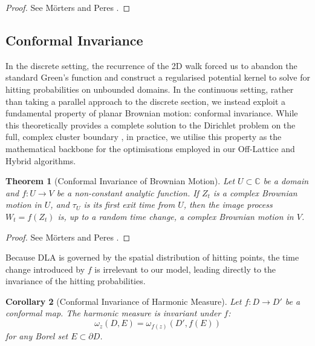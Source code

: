 \documentclass[12pt, a4paper, oneside]{report}
\newtheorem{theorem}{Theorem}[chapter]
\newtheorem{corollary}[theorem]{Corollary}
\theoremstyle{remark}
\begin{document}
\begin{proof}
See M{\"o}rters and Peres \cite[Theorem 3.18]{Morters2010}.
\end{proof}

\subsection{Conformal Invariance}
\label{sec:conformal_invariance}

In the discrete setting, the recurrence of the 2D walk forced us to abandon the standard Green's function and construct a regularised potential kernel to solve for hitting probabilities on unbounded domains. In the continuous setting, rather than taking a parallel approach to the discrete section, we instead exploit a fundamental property of planar Brownian motion: conformal invariance. While this theoretically provides a complete solution to the Dirichlet problem on the full, complex cluster boundary \cite{Hastings1998}, in practice, we utilise this property as the mathematical backbone for the optimisations employed in our Off-Lattice and Hybrid algorithms.

\begin{theorem}[Conformal Invariance of Brownian Motion]
    \label{the:conformal_invariance}
Let $U \subset \mathbb{C}$ be a domain and $f: U \to V$ be a non-constant analytic function. If $Z_t$ is a complex Brownian motion in $U$, and $\tau_U$ is its first exit time from $U$, then the image process $W_t = f(Z_t)$ is, up to a random time change, a complex Brownian motion in $V$. 

\end{theorem}

\begin{proof}
See M{\"o}rters and Peres \cite[Theorem 7.20]{Morters2010}.
\end{proof}

Because DLA is governed by the spatial distribution of hitting points, the time change introduced by $f$ is irrelevant to our model, leading directly to the invariance of the hitting probabilities.

\begin{corollary}[Conformal Invariance of Harmonic Measure]
Let $f: D \to D'$ be a conformal map. The harmonic measure is invariant under $f$:
\begin{equation*}
    \omega_z(D, E) = \omega_{f(z)}(D', f(E))
\end{equation*}
for any Borel set $E \subset \partial D$.
\end{corollary}
\end{document}
